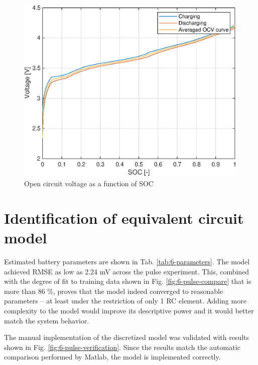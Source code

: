 \begin{figure}
    \centering
    \includegraphics{figures/6/ocv.eps}
    \caption{Open circuit voltage as a function of SOC}
    \label{fig:6-ocv}
\end{figure}

\section{Identification of equivalent circuit model}

Estimated battery parameters are shown in Tab. \ref{tab:6-parameters}. The model achieved RMSE as low as 2.24 mV across the pulse experiment. This, combined with the degree of fit to training data shown in Fig. \ref{fig:6-pulse-compare} that is more than 86 \%, proves that the model indeed converged to reasonable parameters -- at least under the restriction of only 1 RC element. Adding more complexity to the model would improve its descriptive power and it would better match the system behavior.

The manual implementation of the discretized model was validated with results shown in Fig. \ref{fig:6-pulse-verification}. Since the results match the automatic comparison performed by Matlab, the model is implemented correctly.

